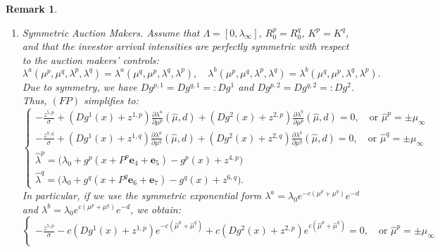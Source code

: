 \documentclass[12pt]{article}
\newtheorem{remark}[theorem2]{Remark}
\begin{document}
\begin{remark}
\begin{enumerate}
\[\begin{cases}
    \hat{\lambda}^q = \big( \lambda_0 + g^q(x + P^q\mathbf{e}_6 + \mathbf{e}_7) - g^q(x) \big).
    \end{cases}
    \]
    Consequently, the set $U$ contains all matrices $z \in \mathbb{R}^{7 \times 2}$ such that $z^{k,i} = 0$ for $k \in \{3,\dots,7\}$ and:
    \[ 
    \begin{cases}
    \frac{Dg^{p,1}(x)+z^{1,p}}{Dg^{p,2}(x)+z^{2,p}} = \frac{Dg^{q,1}(x)+z^{1,q}}{Dg^{q,2}(x)+z^{2,q}} > 0 \\
    Dg^{p,1}(x)+z^{1,p} < 0 \\
    Dg^{q,1}(x)+z^{1,q} < 0.
    \end{cases}
    \]

    \item \textit{Symmetric Auction Makers.}
    Assume that $\Lambda = [0,\lambda_\infty]$, $R_0^p = R_0^q$, $K^p = K^q$, and that the investor arrival intensities are perfectly symmetric with respect to the auction makers' controls:
    \[\lambda^a(\mu^p,\mu^q,\lambda^p,\lambda^q) = \lambda^a(\mu^q,\mu^p,\lambda^q,\lambda^p), \quad \lambda^b(\mu^p,\mu^q,\lambda^p,\lambda^q) = \lambda^b(\mu^q,\mu^p,\lambda^q,\lambda^p).\] 
    Due to symmetry, we have $Dg^{p,1} = Dg^{q,1} =: Dg^1$ and $Dg^{p,2} = Dg^{q,2} =: Dg^2$. Thus, $(FP)$ simplifies to:
    \[ 
    \begin{cases}
    -\frac{z^{5,p}}{\sigma} + (Dg^1(x)+z^{1,p})\frac{\partial \lambda^a}{\partial \mu^p}(\hat{\mu},d) + (Dg^2(x)+z^{2,p})\frac{\partial \lambda^b}{\partial \mu^p}(\hat{\mu},d) = 0, \quad \text{or } \hat{\mu}^p = \pm \mu_{\infty} \\
    -\frac{z^{7,q}}{\sigma} + (Dg^1(x)+z^{1,q})\frac{\partial \lambda^a}{\partial \mu^q}(\hat{\mu},d) + (Dg^2(x)+z^{2,q})\frac{\partial \lambda^b}{\partial \mu^q}(\hat{\mu},d) = 0, \quad \text{or } \hat{\mu}^q = \pm \mu_{\infty} \\
    \hat{\lambda}^p = \big( \lambda_0 + g^p(x + P^p\mathbf{e}_4 + \mathbf{e}_5) - g^p(x) + z^{4,p} \big) \\
    \hat{\lambda}^q = \big( \lambda_0 + g^q(x + P^q\mathbf{e}_6 + \mathbf{e}_7) - g^q(x) + z^{6,q} \big).
    \end{cases}
    \]
    In particular, if we use the symmetric exponential form $\lambda^a = \lambda_0 e^{-c(\mu^p+\mu^q)} e^{-d}$ and $\lambda^b = \lambda_0 e^{c(\mu^p + \mu^q)}e^{-d}$, we obtain:
    \[ 
    \begin{cases}
    -\frac{z^{5,p}}{\sigma} - c(Dg^1(x)+z^{1,p})e^{-c(\hat{\mu}^p + \hat{\mu}^q)} + c(Dg^2(x)+z^{2,p})e^{c(\hat{\mu}^p + \hat{\mu}^q)} = 0, \quad \text{or } \hat{\mu}^p = \pm \mu_{\infty} \\

\end{cases}\]
\end{enumerate}
\end{remark}
\end{document}
